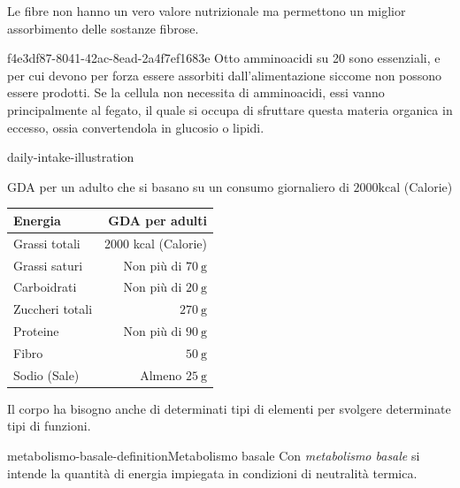 \documentclass[preview]{standalone}
\begin{document}


\begin{plainhtml}
    Le fibre non hanno un vero valore nutrizionale ma permettono un miglior assorbimento delle sostanze fibrose.
\end{plainhtml}


\begin{snippet}{f4e3df87-8041-42ac-8ead-2a4f7ef1683e}
    Otto amminoacidi su 20 sono essenziali, e per cui devono per forza essere assorbiti dall'alimentazione
siccome non possono essere prodotti. 
Se la cellula non necessita di amminoacidi, essi vanno principalmente al fegato, il quale si occupa
di sfruttare questa materia organica in eccesso, ossia convertendola in glucosio o lipidi.
\end{snippet}


\begin{snippet}{daily-intake-illustration}
    \begin{center}
    GDA per un adulto che si basano su un consumo giornaliero di $2000 \mathrm{kcal}$ (Calorie)
    \begin{tabular}{|l|r|}
    \hline Energia & GDA per adulti \\
    \hline Grassi totali & 2000 kcal (Calorie) \\
    \hline Grassi saturi & Non più di $70 \mathrm{~g}$ \\
    \hline Carboidrati & Non più di $20 \mathrm{~g}$ \\
    \hline Zuccheri totali & $270 \mathrm{~g}$ \\
    \hline Proteine & Non più di $90 \mathrm{~g}$ \\
    \hline Fibro & $50 \mathrm{~g}$ \\
    \hline Sodio (Sale) & Almeno $25 \mathrm{~g}$ \\
    \hline
    \end{tabular}
    \end{center}
    \phantom{}
\end{snippet}

\begin{plainhtml}
    Il corpo ha bisogno anche di determinati tipi di elementi per svolgere determinate tipi di funzioni.
\end{plainhtml}

\begin{snippetdefinition}{metabolismo-basale-definition}{Metabolismo basale}
    Con \textit{metabolismo basale} si intende la quantità di energia impiegata in condizioni di neutralità termica.
\end{snippetdefinition}
\end{document}
